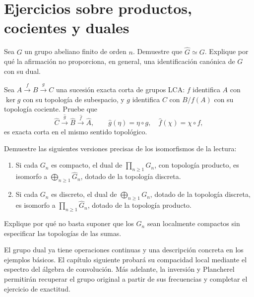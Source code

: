 \section{Ejercicios sobre productos, cocientes y duales}
\begin{ejercicio}\label{ej:v4-l25-1}
Sea $G$ un grupo abeliano finito de orden $n$. Demuestre que $\widehat G\simeq G$. Explique por qué la afirmación no proporciona, en general, una identificación canónica de $G$ con su dual.
\end{ejercicio}


\begin{ejercicio}\label{ej:v4-l25-2}
Sea $A\xrightarrow{f}B\xrightarrow{g}C$ una sucesión exacta corta de grupos LCA: $f$ identifica $A$ con $\ker g$ con su topología de subespacio, y $g$ identifica $C$ con $B/f(A)$ con su topología cociente. Pruebe que
\[
 \widehat C\xrightarrow{\widehat g}\widehat B
 \xrightarrow{\widehat f}\widehat A,
 \qquad \widehat g(\eta)=\eta\circ g,\quad
 \widehat f(\chi)=\chi\circ f,
\]
es exacta corta en el mismo sentido topológico.
\end{ejercicio}


\begin{ejercicio}\label{ej:v4-l25-3}
Demuestre las siguientes versiones precisas de los isomorfismos de la lectura:
\begin{enumerate}
\item Si cada $G_n$ es compacto, el dual de $\prod_{n\ge1}G_n$, con topología producto, es isomorfo a $\bigoplus_{n\ge1}\widehat G_n$, dotado de la topología discreta.
\item Si cada $G_n$ es discreto, el dual de $\bigoplus_{n\ge1}G_n$, dotado de la topología discreta, es isomorfo a $\prod_{n\ge1}\widehat G_n$, dotado de la topología producto.
\end{enumerate}
Explique por qué no basta suponer que los $G_n$ sean localmente compactos sin especificar las topologías de las sumas.
\end{ejercicio}


El grupo dual ya tiene operaciones continuas y una descripción concreta en los ejemplos básicos. El capítulo siguiente probará su compacidad local mediante el espectro del álgebra de convolución. Más adelante, la inversión y Plancherel permitirán recuperar el grupo original a partir de sus frecuencias y completar el ejercicio de exactitud.
